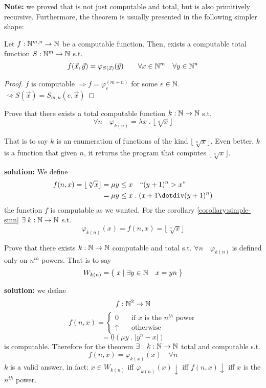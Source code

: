\textbf{Note:} we proved that \smn is not just computable and total,
but is also primitively recursive. Furthermore, the theorem is usually presented
in the following simpler shape:

\begin{corollary}\label{corollary:simple-smn}
  Let $f: \mathbb{N}^{m,n} \rightarrow \mathbb{N}$ be a computable function. Then,
  exists a computable total function $S: \mathbb{N}^m\rightarrow \mathbb{N}$ s.t.
  \[
    f(\vec{x}, \vec{y}) = \varphi_{S(\vec{x})}(\vec{y}) \quad \quad
    \forall x \in \mathbb{N}^m \quad \forall y \in \mathbb{N}^n
  \]
  \begin{proof}
    $f$ is computable $\Rightarrow f = \varphi_e^{(m+n)}$ for some
    $e \in \mathbb{N}$. $\rightsquigarrow S(\vec{x}) = S_{m,n}(e, \vec{x})$
  \end{proof}
\end{corollary}

\begin{exercise}
  Prove that there exists a total computable function $k : \mathbb{N} \rightarrow \mathbb{N}$ s.t.
  \[
    \forall n \quad \varphi_{k(n)} = \lambda x \; . \; \lfloor \sqrt[n]{x} \rfloor
  \]

  That is to say $k$ is an enumeration of functions of the kind
  $\lfloor \sqrt[n]{x} \rfloor$. Even better, $k$ is a function that given
  $n$, it returns the program that computes $\lfloor \sqrt[n]{x}
  \rfloor$.

  \textbf{solution:} We define
  \[
    \begin{aligned}
      f(n,x) = \lfloor \sqrt[n]{x} \rfloor &= \mu y \leq x \quad \mbox{``}(y+1)^n > x\mbox{''} \\
      &= \mu y \leq x \; . \; (x+1 \dotdiv (y+1)^n)
    \end{aligned}
  \]
  the function $f$ is computable as we wanted. For the corollary
  \ref{corollary:simple-smn} $\exists \; k: \mathbb{N} \rightarrow \mathbb{N}$ s.t.
  \[
    \varphi_{k(n)}(x) = f(n,x) = \lfloor \sqrt[n]{x} \rfloor
  \]
\end{exercise}

\begin{exercise}
  Prove that there exists $k : \mathbb{N} \rightarrow \mathbb{N}$ computable and total s.t.
  $\forall n \quad \varphi_{k(n)}$ is defined only on $n^{th}$
  powers. That is to say
  \[
    W_{k(n)} = \{ \; x \; | \; \exists y \in \mathbb{N} \quad x = yn \; \}
  \]

  \textbf{solution:} we define
  \[
    f : \mathbb{N}^2 \rightarrow \mathbb{N}
  \]
  \[
    f(n,x) = \begin{cases}
      0 & \quad \mbox{if } x \mbox{ is the } n^{th} \mbox{ power} \\
      \uparrow &\quad \mbox{otherwise}
    \end{cases}
  \]
  \[
    = \underline{0} (\mu y \; . \; |y^n-x|)
  \]
  is computable. Therefore for the \smn theorem
  $\exists \quad k : \mathbb{N} \rightarrow \mathbb{N}$ total and computable s.t.
  \[
    f(n,x) = \varphi_{k(x)}(x) \quad \forall n
  \]
  $k$ is a valid answer, in fact: $x \in W_{k(n)}$ iff
  $\varphi_{k(n)}(x)\downarrow$ iff $f(n,x)\downarrow$ iff $x$ is the
  $n^{th}$ power.
\end{exercise}

